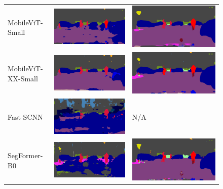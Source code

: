 \documentclass[a4paper,12pt]{report}
\begin{document}
\begin{figure}[]
\begin{tabular}{lll}
        MobileViT-Small    & \includegraphics[width=.3\linewidth,valign=m]{res/lightweight-uda-baseline-qualitative/mobilevit-small-sourceonly.png}    & \includegraphics[width=.3\linewidth,valign=m]{res/lightweight-uda-baseline-qualitative/mobilevit-small-selftraining.png}    \\
        MobileViT-XX-Small & \includegraphics[width=.3\linewidth,valign=m]{res/lightweight-uda-baseline-qualitative/mobilevit-xx-small-sourceonly.png} & \includegraphics[width=.3\linewidth,valign=m]{res/lightweight-uda-baseline-qualitative/mobilevit-xx-small-selftraining.png} \\
        Fast-SCNN          & \includegraphics[width=.3\linewidth,valign=m]{res/lightweight-uda-baseline-qualitative/fast-scnn-sourceonly.png}          & N/A                                                                                                                         \\
        SegFormer-B0       & \includegraphics[width=.3\linewidth,valign=m]{res/lightweight-uda-baseline-qualitative/segformer-mitb0-sourceonly.png}    & \includegraphics[width=.3\linewidth,valign=m]{res/lightweight-uda-baseline-qualitative/segformer-mitb0-selftraining.png}    \\

\end{tabular}
\end{figure}
\end{document}
